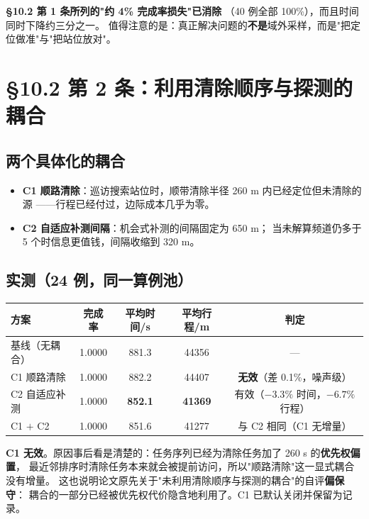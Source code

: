\textbf{§10.2 第 1 条所列的"约 4\% 完成率损失"已消除}
（40 例全部 100\%），而且时间同时下降约三分之一。
值得注意的是：真正解决问题的\textbf{不是}域外采样，而是"把定位做准"与"把站位放对"。

\section{§10.2 第 2 条：利用清除顺序与探测的耦合}

\subsection{两个具体化的耦合}

\begin{itemize}[leftmargin=1.8em]
  \item \textbf{C1 顺路清除}：巡访搜索站位时，顺带清除半径 260 m 内已经定位但未清除的源
        ——行程已经付过，边际成本几乎为零。
  \item \textbf{C2 自适应补测间隔}：机会式补测的间隔固定为 650 m；
        当未解算频道仍多于 5 个时信息更值钱，间隔收缩到 320 m。
\end{itemize}

\subsection{实测（24 例，同一算例池）}

\begin{center}
\begin{tabular}{lcccc}
\toprule
方案 & 完成率 & 平均时间/s & 平均行程/m & 判定 \\ \midrule
基线（无耦合） & 1.0000 & 881.3 & 44356 & --- \\
C1 顺路清除 & 1.0000 & 882.2 & 44407 & \textbf{无效}（差 0.1\%，噪声级） \\
C2 自适应补测 & 1.0000 & \textbf{852.1} & \textbf{41369} & 有效（$-3.3\%$ 时间，$-6.7\%$ 行程） \\
C1 $+$ C2 & 1.0000 & 851.6 & 41277 & 与 C2 相同（C1 无增量） \\
\bottomrule
\end{tabular}
\end{center}

\begin{warnbox}[title=一个必须如实报告的负结果]
\textbf{C1 无效}。原因事后看是清楚的：任务序列已经为清除任务加了 260 s 的\textbf{优先权偏置}，
最近邻排序时清除任务本来就会被提前访问，所以"顺路清除"这一显式耦合没有增量。
这也说明论文原先关于"未利用清除顺序与探测的耦合"的自评\textbf{偏保守}：
耦合的一部分已经被优先权代价隐含地利用了。C1 已默认关闭并保留为记录。
\end{warnbox}

